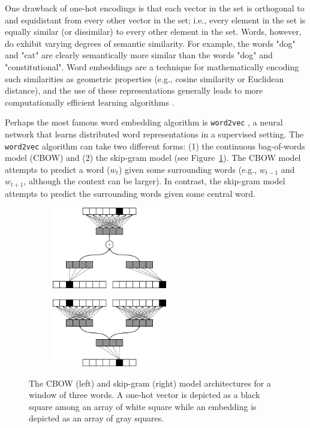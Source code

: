 \documentclass{article}
\begin{document}
One drawback of one-hot encodings is that each vector in the set is orthogonal to and equidistant from every other vector in the set; i.e., every element in the set is equally similar (or dissimilar) to every other element in the set. Words, however, do exhibit varying degrees of semantic similarity. For example, the words "dog" and "cat" are clearly semantically more similar than the words "dog" and "constitutional". Word embeddings are a technique for mathematically encoding such similarities as geometric properties (e.g., cosine similarity or Euclidean distance), and the use of these representations generally leads to more computationally efficient learning algorithms \parencite{Bengio2003}.

Perhaps the most famous word embedding algorithm is \texttt{word2vec} \parencite{Mikolov2013}, a neural network that learns distributed word representations in a supervised setting. The \texttt{word2vec} algorithm can take two different forms: (1) the continuous bag-of-words model (CBOW) and (2) the skip-gram model (see Figure~\ref{fig:word2vec}). The CBOW model attempts to predict a word ($w_t$) given some surrounding words (e.g., $w_{t-1}$ and $w_{t+1}$, although the context can be larger). In contrast, the skip-gram model attempts to predict the surrounding words given some central word.

\begin{figure}[h]
\captionsetup[subfigure]{labelformat=empty}
\centering

    \begin{subfigure}[t]{0.45\textwidth}
    \centering
    \includegraphics[width=5cm]{cbow_fig.png}
    \caption{}
    \end{subfigure}%
    \begin{subfigure}[t]{0.45\textwidth}
    \centering
    \includegraphics[width=5cm]{skip_gram.png}
    \caption{}
    \end{subfigure}

\caption{The CBOW (left) and skip-gram (right) model architectures for a window of three words. A one-hot vector is depicted as a black square among an array of white square while an embedding is depicted as an array of gray squares.}
\label{fig:word2vec}
\end{figure}
\end{document}
